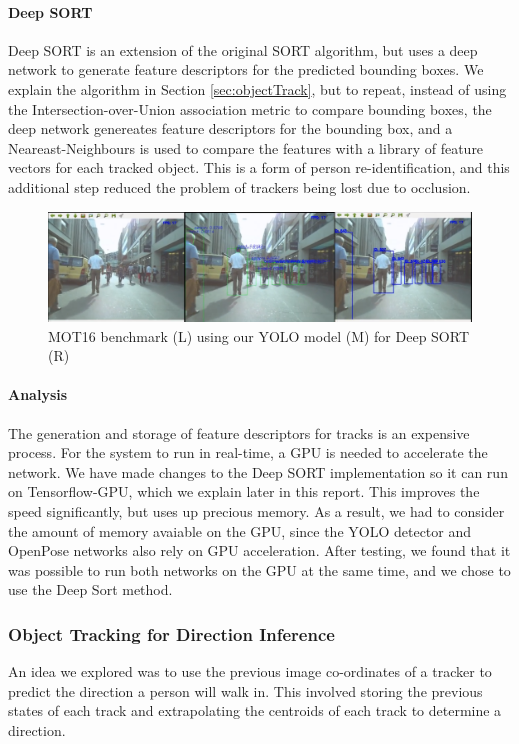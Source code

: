 \paragraph{Deep SORT} Deep SORT is an extension of the original SORT algorithm, but uses a deep network to generate feature descriptors for the predicted bounding boxes. We explain the algorithm in Section \ref{sec:objectTrack}, but to repeat, instead of using the Intersection-over-Union association metric to compare bounding boxes, the deep network genereates feature descriptors for the bounding box, and a Neareast-Neighbours is used to compare the features with a library of feature vectors for each tracked object. This is a form of person re-identification, and this additional step reduced the problem of trackers being lost due to occlusion.

\begin{figure}[ht]
	\centering
	\includegraphics[width=1.0\linewidth]{img/chapter4_analysis/deepSortMOT.png}
	\caption{MOT16 benchmark \cite{Milan} (L) using our YOLO model (M) for Deep SORT (R)}
	\label{fig:deepSortMOT}
	\vspace{-1\baselineskip}
\end{figure}

\paragraph{Analysis} The generation and storage of feature descriptors for tracks is an expensive process. For the system to run in real-time, a GPU is needed to accelerate the network. We have made changes to the Deep SORT implementation so it can run on Tensorflow-GPU, which we explain later in this report. This improves the speed significantly, but uses up precious memory. As a result, we had to consider the amount of memory avaiable on the GPU, since the YOLO detector and OpenPose networks also rely on GPU acceleration. After testing, we found that it was possible to run both networks on the GPU at the same time, and we chose to use the Deep Sort method.

\newpage
\subsubsection{Object Tracking for Direction Inference} \label{sec:objecTrackingDirection}
An idea we explored was to use the previous image co-ordinates of a tracker to predict the direction a person will walk in. This involved storing the previous states of each track and extrapolating the centroids of each track to determine a direction.


